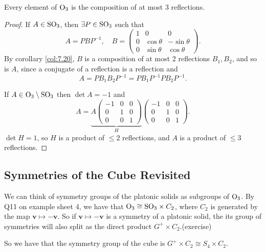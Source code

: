 \documentclass[a4paper]{article}
\begin{document}
\begin{corollary}\label{col:7.23}
  Every element of $\mathrm{O}_3$ is the composition of at most 3 reflections.
\end{corollary}
\begin{proof}
  If $A\in \mathrm{SO}_3$, then $ \exists P\in \mathrm{SO}_3 $ such that
  \[
    A=PBP^{-1}, \quad B=
    \begin{pmatrix}
      1&0&0\\
      0&\cos \theta& -\sin \theta\\
      0&\sin \theta& \cos \theta
    \end{pmatrix}.
  \]
  By corollary \ref{col:7.20}, $B$ is a composition of at most 2
  reflections $B_1,B_2$, and so is $A$, since a conjugate of a
  reflection is a reflection and
  \[
    A=PB_1B_2P^{-1} = PB_1P^{-1}PB_2P^{-1}.
  \]

  If $ A\in \mathrm{O}_3 \setminus \mathrm{SO}_3 $ then $ \det A=-1 $ and
  \[
    A=\underbrace{A
      \begin{pmatrix}
        -1&0&0\\
        0&1&0\\
        0&0&1
    \end{pmatrix}}_{H}
    \begin{pmatrix}
      -1&0&0\\
      0&1&0\\
      0&0&1
    \end{pmatrix}.
  \]
  $ \det H=1 $, so $H$ is a product of $\le 2$ reflections, and $A$
  is a product of $\le 3$ reflections.

\end{proof}
\subsection{Symmetries of the Cube Revisited}
We can think of symmetry groups of the platonic solids as subgroups
of $\mathrm{O}_3$. By Q11 on example sheet 4, we have that $ \mathrm{O}_3 \cong
\mathrm{SO}_3 \times C_2 $, where $C_2$ is generated by the map $ \mathbf{v}
\mapsto -\mathbf{v} $. So if $ \mathbf{v} \mapsto -\mathbf{v} $ is a
symmetry of a platonic solid, the its group of symmetries will also
split as the direct product $ G^+ \times C_2 $.(exercise)

So we have that the symmetry group of the cube is $ G^+\times C_2
\cong S_4 \times C_2 $.
\end{document}

